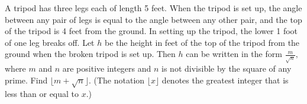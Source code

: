 A tripod has three legs each of length 5 feet.  When the tripod is set up, the angle between any pair of legs is equal to the angle between any other pair, and the top of the tripod is 4 feet from the ground.  In setting up the tripod, the lower 1 foot of one leg breaks off.  Let $h$ be the height in feet of the top of the tripod from the ground when the broken tripod is set up.  Then $h$ can be written in the form $\frac m{\sqrt{n}},$ where $m$ and $n$ are positive integers and $n$ is not divisible by the square of any prime.  Find $\lfloor m+\sqrt{n}\rfloor.$  (The notation $\lfloor x\rfloor$ denotes the greatest integer that is less than or equal to $x$.)